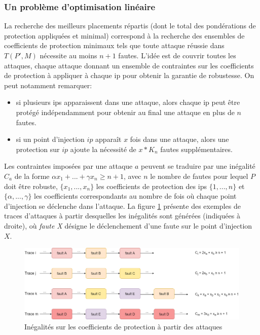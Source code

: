             \subsubsection{Un problème d'optimisation linéaire}
            \label{sec:placement-optimal-ilp}
    
                La recherche des meilleurs placements répartis (dont le total des pondérations de protection appliquées et minimal) correspond à la recherche des ensembles de coefficients de protection minimaux tels que toute attaque réussie dans $T(P', M)$ nécessite au moins $n + 1$ fautes. 
                L'idée est de couvrir toutes les attaques, chaque attaque donnant un ensemble de contraintes sur les coefficients de protection à appliquer à chaque \gls{ip} pour obtenir la garantie de robustesse. On peut notamment remarquer:
                \begin{itemize}
                    \item si plusieurs \gls{ip}s apparaissent dans une attaque, alors chaque \gls{ip} peut être protégé indépendamment pour obtenir au final une attaque en plus de $n$ fautes.
                    \item si un point d'injection $ip$ apparaît $x$ fois dans une attaque, alors une protection sur $ip$ ajoute la nécessité de $x*K_n$ fautes supplémentaires.
                \end{itemize}        
        
                Les contraintes imposées par une attaque $a$ peuvent se traduire par une inégalité $C_a$ de la forme $\alpha x_1 + ... + \gamma x_n \geq n + 1$, avec $n$ le nombre de fautes pour lequel $P$ doit être robuste, $\{x_1, ..., x_n\}$ les coefficients de protection des \gls{ip}s $\{1, ..., n\}$ et $\{\alpha, ..., \gamma\}$ les coefficients correspondants au nombre de fois où chaque point d'injection se déclenche dans l'attaque.
                La figure \ref{fig:placement-ineq} présente des exemples de traces d'attaques à partir desquelles les inégalités sont générées (indiquées à droite), où \textit{faute X} désigne le déclenchement d'une faute sur le point d'injection $X$.  
                
                \begin{figure}[!h]\centering
                    \includegraphics[scale=0.29]{ch5-placement/img/placement-eq.drawio.png}
                    \caption{Inégalités sur les coefficients de protection à partir des attaques}
                    \label{fig:placement-ineq}
                \end{figure}
                
